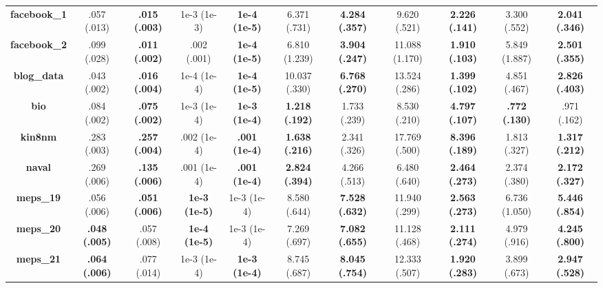 \documentclass{article}
\begin{document}
\begin{appendices}
\begin{table}[htbp]
{\begin{tabular}{ccccccccccc}
    \midrule
    \textbf{facebook\_1} &           .057 (.013) &  \textbf{.015 (.003)} &           1e-3 (1e-3) &  \textbf{1e-4 (1e-5)} &           6.371 (.731) &  \textbf{4.284 (.357)} &       9.620 (.521) &  \textbf{2.226 (.141)} &          3.300 (.552) &  \textbf{2.041 (.346)} \\
    \textbf{facebook\_2} &           .099 (.028) &  \textbf{.011 (.002)} &           .002 (.001) &  \textbf{1e-4 (1e-5)} &          6.810 (1.239) &  \textbf{3.904 (.247)} &     11.088 (1.170) &  \textbf{1.910 (.103)} &         5.849 (1.887) &  \textbf{2.501 (.355)} \\
    \textbf{blog\_data}  &           .043 (.002) &  \textbf{.016 (.004)} &           1e-4 (1e-4) &  \textbf{1e-4 (1e-5)} &          10.037 (.330) &  \textbf{6.768 (.270)} &      13.524 (.286) &  \textbf{1.399 (.102)} &          4.851 (.467) &  \textbf{2.826 (.403)} \\
    \textbf{bio}        &           .084 (.002) &  \textbf{.075 (.002)} &           1e-3 (1e-4) &  \textbf{1e-3 (1e-4)} &  \textbf{1.218 (.192)} &           1.733 (.239) &       8.530 (.210) &  \textbf{4.797 (.107)} &  \textbf{.772 (.130)} &            .971 (.162) \\
    \textbf{kin8nm}     &           .283 (.003) &  \textbf{.257 (.004)} &           .002 (1e-4) &  \textbf{.001 (1e-4)} &  \textbf{1.638 (.216)} &           2.341 (.326) &      17.769 (.500) &  \textbf{8.396 (.189)} &          1.813 (.327) &  \textbf{1.317 (.212)} \\
    \textbf{naval}      &           .269 (.006) &  \textbf{.135 (.006)} &           .001 (1e-4) &  \textbf{.001 (1e-4)} &  \textbf{2.824 (.394)} &           4.266 (.513) &       6.480 (.640) &  \textbf{2.464 (.273)} &          2.374 (.380) &  \textbf{2.172 (.327)} \\
    \textbf{meps\_19}    &           .056 (.006) &  \textbf{.051 (.006)} &  \textbf{1e-3 (1e-5)} &           1e-3 (1e-4) &           8.580 (.644) &  \textbf{7.528 (.632)} &      11.940 (.299) &  \textbf{2.563 (.273)} &         6.736 (1.050) &  \textbf{5.446 (.854)} \\
    \textbf{meps\_20}    &  \textbf{.048 (.005)} &           .057 (.008) &  \textbf{1e-4 (1e-5)} &           1e-3 (1e-4) &           7.269 (.697) &  \textbf{7.082 (.655)} &      11.128 (.468) &  \textbf{2.111 (.274)} &          4.979 (.916) &  \textbf{4.245 (.800)} \\
    \textbf{meps\_21}    &  \textbf{.064 (.006)} &           .077 (.014) &           1e-3 (1e-4) &  \textbf{1e-3 (1e-4)} &           8.745 (.687) &  \textbf{8.045 (.754)} &      12.333 (.507) &  \textbf{1.920 (.283)} &          3.899 (.673) &  \textbf{2.947 (.528)} \\
    

\end{tabular}}
\end{table}
\end{appendices}
\end{document}
